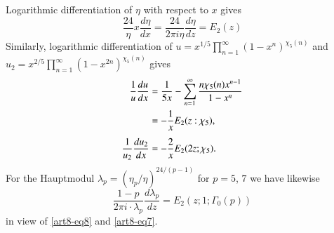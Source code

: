 Logarithmic differentiation of $\eta$ with respect to $x$ gives
\begin{equation}
\frac{24}{\eta}x\dfrac{d\eta}{dx}=\dfrac{24}{2\pi i\eta}\dfrac{d\eta}{dz}=E_{2}(z)\label{art8-eq8}
\end{equation}
Similarly, logarithmic differentiation of $u=x^{1/5}\prod\limits^{\infty}_{n=1}(1-x^{n})^{\chi_{5}(n)}$ and $u_{2}=x^{2/5}\prod\limits^{\infty}_{n=1}(1-x^{2n})^{\chi_{5}(n)}$ gives
\begin{align}
\frac{1}{u}\dfrac{du}{dx} &= \frac{1}{5x}-\sum\limits^{\infty}_{n=1}\frac{n\chi_{5}(n)x^{n-1}}{1-x^{n}}\label{art8-eq9}\\
&= -\frac{1}{x}E_{2}(z:\chi_{5}),\notag\\[4pt]
\frac{1}{u_{2}}\frac{du_{2}}{dx} &= -\frac{2}{x}E_{2}(2z;\chi_{5}).\notag
\end{align}
For the Hauptmodul $\lambda_{p}=(\eta_{p}/\eta)^{24/(p-1)}$ for $p=5$, $7$ we have likewise
\begin{equation}
\frac{1-p}{2\pi i\cdot \lambda_{p}}\frac{d\lambda_{p}}{dz}=E_{2}(z;1;\Gamma_{0}(p))\label{art8-eq10}
\end{equation}
in view of \eqref{art8-eq8} and \eqref{art8-eq7}.

